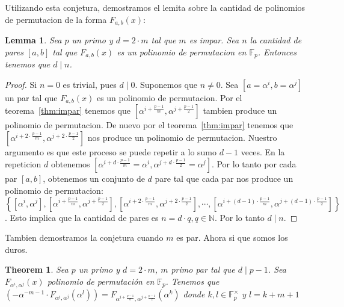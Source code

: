 \documentclass[12pt]{article}
\newtheorem{lemma}{Lemma}
\newtheorem{theorem}{Theorem}
\begin{document}
Utilizando esta conjetura, demostramos el lemita sobre la cantidad de polinomios de permutacion de la forma $F_{a,b}(x)$:

\begin{lemma}
    Sea $p$ un primo y $d=2\cdot m$ tal que $m$ es impar. Sea $n$ la cantidad de pares $[a,b]$ tal que $F_{a,b}(x)$ es un polinomio de permutacion en $\mathbb{F}_p$. Entonces tenemos que $d\mid n$.
\end{lemma}

\begin{proof}
    Si $n=0$ es trivial, pues $d\mid 0$. Suponemos que $n\neq 0$. Sea $[a=\alpha^i,b=\alpha^j]$ un par tal que $F_{a,b}(x)$ es un polinomio de permutacion. Por el teorema~\ref{thm:impar} tenemos que $[\alpha^{i+\frac{p-1}{m}},\alpha^{j+\frac{p-1}{2}}]$ tambien produce un polinomio de permutacion. De nuevo por el teorema~\ref{thm:impar} tenemos que $[\alpha^{i+2\cdot \frac{p-1}{m}},\alpha^{j+2\cdot\frac{p-1}{2}}]$ nos produce un polinomio de permutacion. Nuestro argumento es que este proceso se puede repetir a lo sumo $d-1$ veces. En la repeticion $d$ obtenemos $[\alpha^{i+d\cdot\frac{p-1}{m}}=\alpha^i,\alpha^{j+d\cdot \frac{p-1}{2}}=\alpha^j]$. Por lo tanto por cada par $[a,b]$, obtenemos un conjunto de $d$ pare tal que cada par nos produce un polinomio de permutacion: $\left\{ [\alpha^i,\alpha^j],[\alpha^{i+\frac{p-1}{m}},\alpha^{j+\frac{p-1}{2}}], [\alpha^{i+2\cdot \frac{p-1}{m}},\alpha^{j+2\cdot \frac{p-1}{2}}], \cdots, [\alpha^{i+(d-1)\cdot \frac{p-1}{m}},\alpha^{j+(d-1)\cdot \frac{p-1}{2}}] \right\}$. Esto implica que la cantidad de pares es $n=d\cdot q, q \in \mathbb{N}$. Por lo tanto $d\mid n$.
\end{proof}


Tambien demostramos la conjetura cuando $m$ es par. Ahora si que somos los duros.

\begin{theorem}\label{thm:par}
Sea $p$ un primo y $d = 2\cdot m$, $m$ primo par tal que $d\mid p-1$. Sea $F_{\alpha^i,\alpha^j}(x)$ polinomio de permutación en $\mathbb{F}_p$. Tenemos que $(-\alpha^{-m-1}\cdot F_{\alpha^i,\alpha^j}(\alpha^l)) = F_{\alpha^{i+\frac{p-1}{d}},\alpha^{j+\frac{p-1}{2}}}(\alpha^{k})$ donde $k,l \in \mathbb{F}_p^\times$ y $l=k+m+1$    
\end{theorem}
\end{document}
